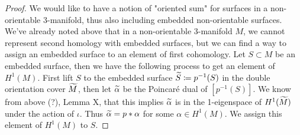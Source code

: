 \begin{proof}
We would like to have a notion of "oriented sum" for surfaces in a non-orientable 3-manifold, thus also including embedded non-orientable surfaces. We've already noted above that in a non-orientable 3-manifold $M$, we cannot represent second homology with embedded surfaces, but we can find a way to assign an embedded surface to an element of first cohomology. Let $S \subset M$ be an embedded surface, then we have the following process to get an element of $H^1(M)$. First lift $S$ to the embedded surface $\widetilde{S} \coloneqq p^{-1}(S)$ in the double orientation cover $\widetilde{M}$, then let $\widetilde{\alpha}$ be the Poincar\'e dual of $[p^{-1}(S)]$. We know from above (?), Lemma X, that this implies $\widetilde{\alpha}$ is in the 1-eigenspace of $H^1(\widetilde{M})$ under the action of $\iota$. Thus $\widetilde{\alpha} = p*\alpha$ for some $\alpha \in H^1(M)$. We assign this element of $H^1(M)$ to $S$. 
    
\end{proof}